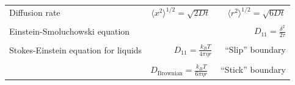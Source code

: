 \documentclass[11pt]{article}
\begin{document}
\begin{table}
\begin{center}
\begin{tabular}{|lr|}
Diffusion rate &
$\displaystyle \langle x^2 \rangle^{1/2} = \sqrt{2 D t} $\ \ \ \  $\langle r^2 \rangle^{1/2} = \sqrt{6
D t}$ \\ & \\

Einstein-Smoluchowski equation & $\displaystyle D_{11}= \frac{\delta^2}{2\tau}$ \\ & \\

Stokes-Einstein equation for liquids & $\displaystyle D_{11}=\frac{k_BT}{4\pi\eta r}$\ \ \
``Slip'' boundary \\
 & \\
 & $\displaystyle D_\mathrm{Brownian}=\frac{k_BT}{6\pi\eta r}$\ \ \ ``Stick'' boundary \\
\hline
    \end{tabular}
\end{center}
 \end{table}
\end{document}
